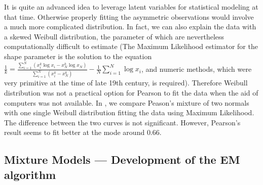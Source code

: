 It is quite an advanced idea to leverage latent variables for statistical
modeling at that time. Otherwise properly fitting the asymmetric observations
would involve a much more complicated distribution. In fact, we can also explain
the data with a skewed Weibull distribution, the parameter of which are
nevertheless computationally difficult to estimate (The Maximum Likelihood
estimator for the shape parameter is the solution to the equation $\frac{1}{k} =
\frac{\sum_{i=1}^N (x_i^k\log x_i - x_N^k \log x_N) }{\sum_{i=1}^N (x_i^k -
x_N^k)}- \frac{1}{N}\sum\limits_{i=1}^N \log x_i$, and numeric methods, which
were very primitive at the time of late 19th century, is required). Therefore
Weibull distribution was not a practical option for Pearson to fit the data when
the aid of computers was not available. In , we
compare Peason's mixture of two normals with one single Weibull distribution
fitting the data using Maximum Likelihood. The difference between the two curves
is not significant. However, Pearson's result seems to fit better at the mode
around $0.66$.

\subsection{Mixture Models --- Development of the EM algorithm}


